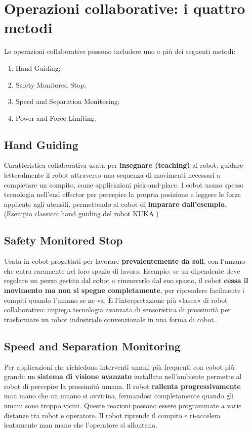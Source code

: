 \section{Operazioni collaborative: i quattro metodi}
Le operazioni collaborative possono includere uno o più dei seguenti metodi:
\begin{enumerate}
    \item Hand Guiding;
    \item Safety Monitored Stop;
    \item Speed and Separation Monitoring;
    \item Power and Force Limiting.
\end{enumerate}

\subsection{Hand Guiding}
Caratteristica collaborativa usata per \textbf{insegnare (teaching)} al robot: guidare letteralmente il robot attraverso una sequenza di movimenti necessari a completare un compito, come applicazioni pick-and-place. I cobot usano spesso tecnologia nell'end effector per percepire la propria posizione e leggere le forze applicate agli utensili, permettendo al cobot di \textbf{imparare dall'esempio}. (Esempio classico: hand guiding del robot KUKA.)

\subsection{Safety Monitored Stop}
Usata in cobot progettati per lavorare \textbf{prevalentemente da soli}, con l'umano che entra raramente nel loro spazio di lavoro. Esempio: se un dipendente deve regolare un pezzo gestito dal cobot o rimuoverlo dal suo spazio, il cobot \textbf{cessa il movimento ma non si spegne completamente}, per riprendere facilmente i compiti quando l'umano se ne va. È l'interpretazione più «lasca» di robot collaborativo: impiega tecnologia avanzata di sensoristica di prossimità per trasformare un robot industriale convenzionale in una forma di cobot.

\subsection{Speed and Separation Monitoring}
Per applicazioni che richiedono interventi umani più frequenti con cobot più grandi: un \textbf{sistema di visione avanzato} installato nell'ambiente permette al robot di percepire la prossimità umana. Il robot \textbf{rallenta progressivamente} man mano che un umano si avvicina, fermandosi completamente quando gli umani sono troppo vicini. Queste reazioni possono essere programmate a varie distanze tra robot e operatore. Il robot riprende il compito e ri-accelera lentamente man mano che l'operatore si allontana.

